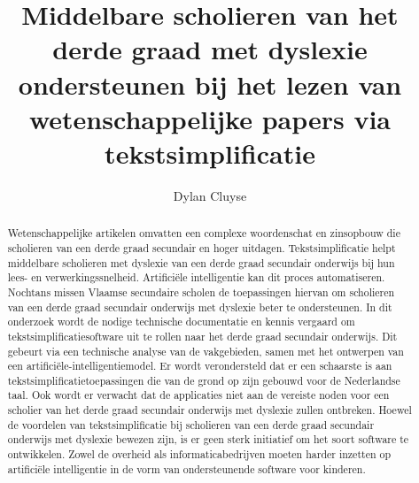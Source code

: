 \documentclass{hogent-article}
\title{Middelbare scholieren van het derde graad met dyslexie ondersteunen bij het lezen van wetenschappelijke papers via tekstsimplificatie}
\author{Dylan Cluyse}
\begin{document}
\begin{abstract}
Wetenschappelijke artikelen omvatten een complexe woordenschat en zinsopbouw die scholieren van een derde graad secundair en hoger uitdagen. Tekstsimplificatie helpt middelbare scholieren met dyslexie van een derde graad secundair onderwijs bij hun lees- en verwerkingssnelheid. Artificiële intelligentie kan dit proces automatiseren. Nochtans missen Vlaamse secundaire scholen de toepassingen hiervan om scholieren van een derde graad secundair onderwijs met dyslexie beter te ondersteunen. In dit onderzoek wordt de nodige technische documentatie en kennis vergaard om tekstsimplificatiesoftware uit te rollen naar het derde graad secundair onderwijs. Dit gebeurt via een technische analyse van de vakgebieden, samen met het ontwerpen van een artificiële-intelligentiemodel. Er wordt verondersteld dat er een schaarste is aan tekstsimplificatietoepassingen die van de grond op zijn gebouwd voor de Nederlandse taal. Ook wordt er verwacht dat de applicaties niet aan de vereiste noden voor een scholier van het derde graad secundair onderwijs met dyslexie zullen ontbreken. Hoewel de voordelen van tekstsimplificatie bij scholieren van een derde graad secundair onderwijs met dyslexie bewezen zijn, is er geen sterk initiatief om het soort software te ontwikkelen. Zowel de overheid als informaticabedrijven moeten harder inzetten op artificiële intelligentie in de vorm van ondersteunende software voor kinderen.
\end{abstract}

\tableofcontents



\printbibliography[heading=bibintoc]
\end{document}
